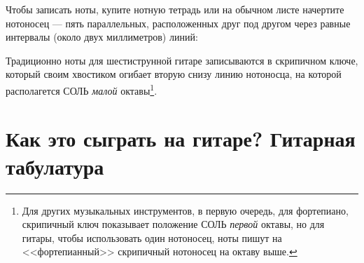 Чтобы записать ноты, купите нотную тетрадь или на обычном листе начертите нотоносец --- пять параллельных, расположенных друг под другом через равные интервалы (около двух миллиметров) линий:
 

Традиционно ноты для шестиструнной гитаре записываются в скрипичном ключе, который своим хвостиком огибает вторую снизу линию нотоносца, на которой располагется СОЛЬ \emph{малой} октавы\footnote{Для других музыкальных инструментов, в первую очередь, для фортепиано, скрипичный ключ показывает положение СОЛЬ \emph{первой} октавы, но для гитары, чтобы использовать один нотоносец, ноты пишут на <<фортепианный>> скрипичный нотоносец на октаву выше.}.

\section{Как это сыграть на гитаре? Гитарная табулатура}



